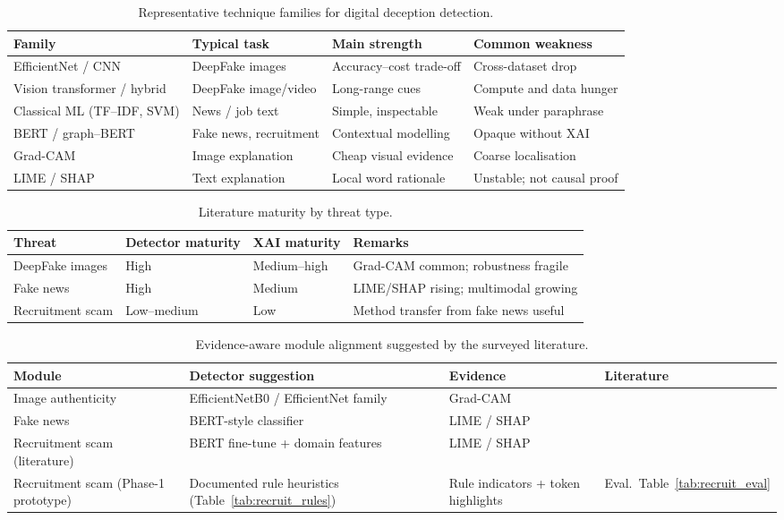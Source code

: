\documentclass[runningheads]{llncs}
\begin{document}
\begin{table}
\caption{Representative technique families for digital deception detection.}
\label{tab1}
\begin{tabular}{|p{2.4cm}|p{2.3cm}|p{2.6cm}|p{2.6cm}|}
\hline
Family & Typical task & Main strength & Common weakness\\
\hline
EfficientNet / CNN & DeepFake images & Accuracy--cost trade-off & Cross-dataset drop\\
\hline
Vision transformer / hybrid & DeepFake image/video & Long-range cues & Compute and data hunger\\
\hline
Classical ML (TF--IDF, SVM) & News / job text & Simple, inspectable & Weak under paraphrase\\
\hline
BERT / graph--BERT & Fake news, recruitment & Contextual modelling & Opaque without XAI\\
\hline
Grad-CAM & Image explanation & Cheap visual evidence & Coarse localisation\\
\hline
LIME / SHAP & Text explanation & Local word rationale & Unstable; not causal proof\\
\hline
\end{tabular}
\end{table}

\begin{table}
\caption{Literature maturity by threat type.}
\label{tab2}
\begin{tabular}{|l|l|l|p{3.6cm}|}
\hline
Threat & Detector maturity & XAI maturity & Remarks\\
\hline
DeepFake images & High & Medium--high & Grad-CAM common; robustness fragile\\
\hline
Fake news & High & Medium & LIME/SHAP rising; multimodal growing\\
\hline
Recruitment scam & Low--medium & Low & Method transfer from fake news useful\\
\hline
\end{tabular}
\end{table}

\begin{table}
\caption{Evidence-aware module alignment suggested by the surveyed literature.}
\label{tab3}
\begin{tabular}{|p{2.3cm}|p{3.1cm}|p{2.4cm}|p{2.6cm}|}
\hline
Module & Detector suggestion & Evidence & Literature\\
\hline
Image authenticity & EfficientNetB0 / EfficientNet family & Grad-CAM & \cite{r02,r04,r07,r13,r39}\\
\hline
Fake news & BERT-style classifier & LIME / SHAP & \cite{r27,r26,r40}\\
\hline
Recruitment scam (literature) & BERT fine-tune + domain features & LIME / SHAP & \cite{r38,r37}\\
\hline
Recruitment scam (Phase-1 prototype) & Documented rule heuristics (Table~\ref{tab:recruit_rules}) & Rule indicators + token highlights & Eval.\ Table~\ref{tab:recruit_eval}\\
\hline
\end{tabular}
\end{table}
\end{document}
